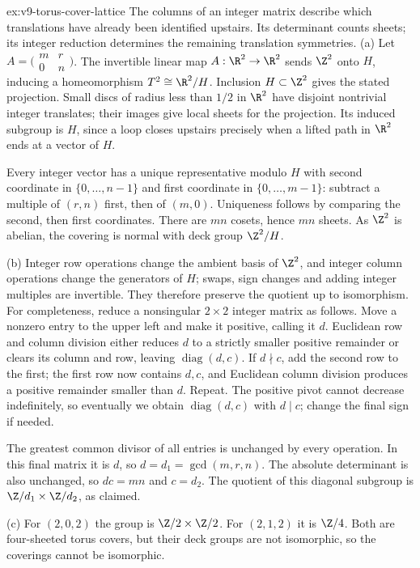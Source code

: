 \begin{solution}{ex:v9-torus-cover-lattice}
\idea The columns of an integer matrix describe which translations have already been identified upstairs. Its determinant counts sheets; its integer reduction determines the remaining translation symmetries.
\writeup (a) Let $A=\bigl(\begin{smallmatrix}m&r\\0&n\end{smallmatrix}\bigr)$. The invertible linear map $A:\R^2\to\R^2$ sends $\Z^2$ onto $H$, inducing a homeomorphism $T^2\cong\R^2/H$. Inclusion $H\subset\Z^2$ gives the stated projection. Small discs of radius less than $1/2$ in $\R^2$ have disjoint nontrivial integer translates; their images give local sheets for the projection. Its induced subgroup is $H$, since a loop closes upstairs precisely when a lifted path in $\R^2$ ends at a vector of $H$.

Every integer vector has a unique representative modulo $H$ with second coordinate in $\{0,\ldots,n-1\}$ and first coordinate in $\{0,\ldots,m-1\}$: subtract a multiple of $(r,n)$ first, then of $(m,0)$. Uniqueness follows by comparing the second, then first coordinates. There are $mn$ cosets, hence $mn$ sheets. As $\Z^2$ is abelian, the covering is normal with deck group $\Z^2/H$.

(b) Integer row operations change the ambient basis of $\Z^2$, and integer column operations change the generators of $H$; swaps, sign changes and adding integer multiples are invertible. They therefore preserve the quotient up to isomorphism. For completeness, reduce a nonsingular $2\times2$ integer matrix as follows. Move a nonzero entry to the upper left and make it positive, calling it $d$. Euclidean row and column division either reduces $d$ to a strictly smaller positive remainder or clears its column and row, leaving $\operatorname{diag}(d,c)$. If $d\nmid c$, add the second row to the first; the first row now contains $d,c$, and Euclidean column division produces a positive remainder smaller than $d$. Repeat. The positive pivot cannot decrease indefinitely, so eventually we obtain $\operatorname{diag}(d,c)$ with $d\mid c$; change the final sign if needed.

The greatest common divisor of all entries is unchanged by every operation. In this final matrix it is $d$, so $d=d_1=\gcd(m,r,n)$. The absolute determinant is also unchanged, so $dc=mn$ and $c=d_2$. The quotient of this diagonal subgroup is $\Z/d_1\times\Z/d_2$, as claimed.

(c) For $(2,0,2)$ the group is $\Z/2\times\Z/2$. For $(2,1,2)$ it is $\Z/4$. Both are four-sheeted torus covers, but their deck groups are not isomorphic, so the coverings cannot be isomorphic.
\end{solution}

